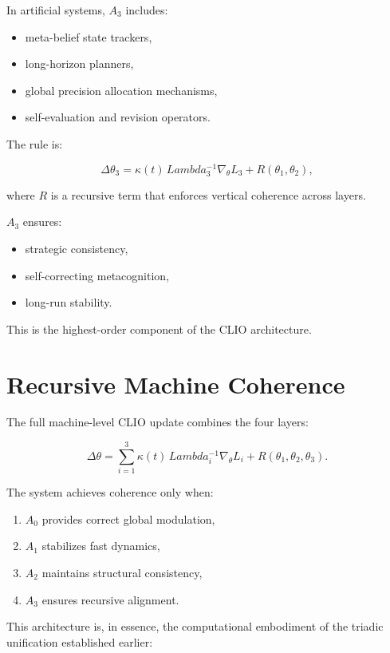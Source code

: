 \documentclass[12pt,oneside]{book}
\theoremstyle{plain}
\theoremstyle{definition}
\def\Lambda{Lambda}%
\begin{document}
In artificial systems, $A_3$ includes:

\begin{itemize}
    \item meta-belief state trackers,
    \item long-horizon planners,
    \item global precision allocation mechanisms,
    \item self-evaluation and revision operators.
\end{itemize}

The rule is:

\[
\Delta \theta_3 =
\kappa(t) \, \Lambda_3^{-1} \nabla_\theta L_3
+ R(\theta_1, \theta_2),
\]

where $R$ is a recursive term that enforces vertical coherence across layers.

$A_3$ ensures:

\begin{itemize}
    \item strategic consistency,
    \item self-correcting metacognition,
    \item long-run stability.
\end{itemize}

This is the highest-order component of the CLIO architecture.

\section{Recursive Machine Coherence}

The full machine-level CLIO update combines the four layers:

\[
\Delta \theta
=
\sum_{i=1}^{3}
\kappa(t)  \, \Lambda_i^{-1} \nabla_\theta L_i
+ R(\theta_1, \theta_2, \theta_3).
\]

The system achieves coherence only when:

\begin{enumerate}
    \item $A_0$ provides correct global modulation,
    \item $A_1$ stabilizes fast dynamics,
    \item $A_2$ maintains structural consistency,
    \item $A_3$ ensures recursive alignment.
\end{enumerate}

This architecture is, in essence, the computational embodiment of the
triadic unification established earlier:
\end{document}
